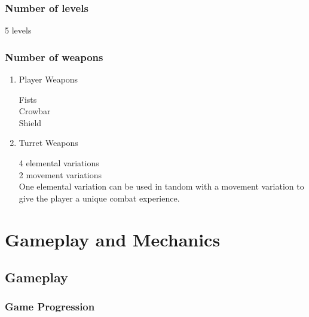 \documentclass{article}
\begin{document}
\subsubsection{Number of levels}
\label{sec:orgd158bf6}

5 levels
\subsubsection{Number of weapons}
\label{sec:orgfd3ca31}
\begin{enumerate}
\item Player Weapons
\label{sec:org3ea8ae1}

Fists \\[0pt]
Crowbar \\[0pt]
Shield
\item Turret Weapons
\label{sec:orgd42d2d5}

4 elemental variations \\[0pt]
2 movement variations \\[0pt]

One elemental variation can be used in tandom with a movement variation to give the player a unique combat experience.
\end{enumerate}
\section{Gameplay and Mechanics}
\label{sec:org60de33d}
\subsection{Gameplay}
\label{sec:org101b3ce}
\subsubsection{Game Progression}
\label{sec:orgedc1568}
\end{document}
